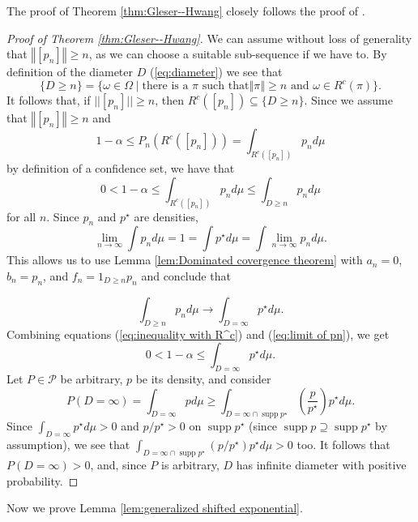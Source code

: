 \documentclass[article]{ajs}
\numberwithin{equation}{section}
\numberwithin{figure}{section}
\theoremstyle{plain}
\theoremstyle{definition}
\theoremstyle{definition}
\theoremstyle{plain}
\DeclareMathOperator{\supp}{supp}
\begin{document}
The proof of Theorem \ref{thm:Gleser--Hwang} closely follows the
proof of \citet[Theorem 1]{gleser1987nonexistence}.
\begin{proof}[Proof of Theorem \ref{thm:Gleser--Hwang}]
\label{proof:Gleser--Hwang}We can assume without loss of generality
that $\left\Vert [p_{n}]\right\Vert \geq n$, as we can choose a suitable sub-sequence
if we have to. By definition of the diameter $D$ (\ref{eq:diameter})
we see that
\[
\{D\geq n\}=\{\omega\in\Omega\mid\textrm{there is a }\pi\textrm{ such that}\left\Vert \pi\right\Vert \geq n\textrm{ and }\omega\in R^{c}(\pi)\}.
\]
It follows that, if $||[p_{n}]||\geq n$, then $R^{c}([p_{n}])\subseteq\{D\geq n\}$.
Since we assume that $\left\Vert [p_{n}]\right\Vert \geq n$ and 
\[
1-\alpha\leq P_{n}(R^{c}([p_{n}]))=\int_{R^{c}([p_{n}])}p_{n}d\mu
\]
by definition of a confidence set, we have that
\begin{equation}
0<1-\alpha\leq\int_{R^{c}([p_{n}])}p_{n}d\mu\leq\int_{D\geq n}p_{n}d\mu\label{eq:inequality with R^c}
\end{equation}
for all $n$. Since $p_{n}$ and $p^{\star}$ are densities,
\[
\lim_{n\to\infty}\int p_{n}d\mu=1=\int p^{\star}d\mu=\int\lim_{n\to\infty}p_{n}d\mu.
\]
This allows us to use Lemma \ref{lem:Dominated covergence theorem}
with $a_{n}=0$, $b_{n}=p_{n}$, and $f_{n}=1_{D\geq n}p_{n}$ and
conclude that

\begin{equation}
\int_{D\geq n}p_{n}d\mu\to\int_{D=\infty}p^{\star}d\mu.\label{eq:limit of pn}
\end{equation}
Combining equations (\ref{eq:inequality with R^c}) and (\ref{eq:limit of pn}),
we get
\[
0<1-\alpha\leq\int_{D=\infty}p^{\star}d\mu.
\]
Let $P\in\mathcal{P}$ be arbitrary, $p$ be its density, and consider
\[
P(D=\infty)=\int_{D=\infty}pd\mu\geq\int_{D=\infty\cap\supp p^{\star}}\left(\frac{p}{p^{\star}}\right)p^{\star}d\mu.
\]
Since $\int_{D=\infty}p^{\star}d\mu>0$ and $p/p^{\star}>0$ on $\supp p^{\star}$
(since $\supp p\supseteq\supp p^{\star}$ by assumption), we see that
$\int_{D=\infty\cap\supp p^{\star}}(p/p^{\star})p^{\star}d\mu>0$
too. It follows that $P(D=\infty)>0$, and, since $P$ is arbitrary,
$D$ has infinite diameter with positive probability.
\end{proof}
Now we prove Lemma \ref{lem:generalized shifted exponential}.
\end{document}
